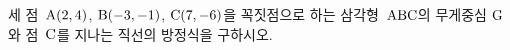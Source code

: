 세 점~$\mathrm{A}(2{,}\mkern3mu\mathopen{}4)$, $\mathrm{B}(-3{,}\mkern3mu\mathopen{}-1)$, $\mathrm{C}(7{,}\mkern3mu\mathopen{}-6)$을 꼭짓점으로 하는 삼각형~$\mathrm{ABC}$의 무게중심 $\mathrm{G}$와 점~$\mathrm{C}$를 지나는 직선의 방정식을 구하시오.
